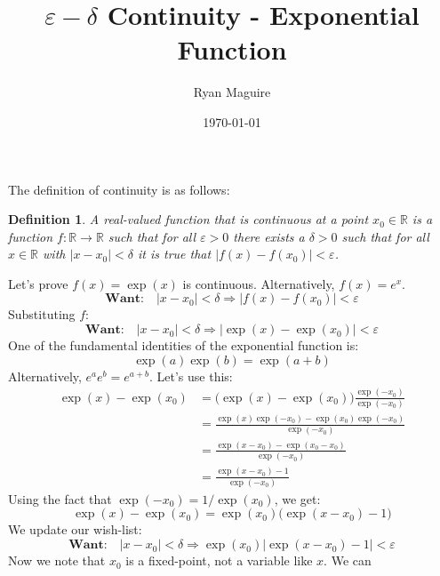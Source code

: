 \documentclass{article}
\title{$\varepsilon-\delta$ Continuity - Exponential Function}
\author{Ryan Maguire}
\date{\today}
\theoremstyle{normal}
\newtheorem{definition}{Definition}
\theoremstyle{plain}
\begin{document}
    \maketitle
    The definition of continuity is as follows:
    \begin{definition}
        A real-valued function that is continuous at a point
        $x_{0}\in\mathbb{R}$ is a function $f:\mathbb{R}\rightarrow\mathbb{R}$
        such that for all $\varepsilon>0$ there exists a $\delta>0$ such that
        for all $x\in\mathbb{R}$ with $|x-x_{0}|<\delta$ it is true that
        $|f(x)-f(x_{0})|<\varepsilon$.
    \end{definition}
    Let's prove $f(x)=\exp(x)$ is continuous. Alternatively, $f(x)=e^{x}$.
    \begin{equation}
        \textbf{Want:}\quad
        |x-x_{0}|<\delta
        \Rightarrow|f(x)-f(x_{0})|<\varepsilon
    \end{equation}
    Substituting $f$:
    \begin{equation}
        \textbf{Want:}\quad
        |x-x_{0}|<\delta
        \Rightarrow
        |\exp(x)-\exp(x_{0})|<\varepsilon
    \end{equation}
    One of the fundamental identities of the exponential function is:
    \begin{equation}
        \exp(a)\exp(b)=\exp(a+b)
    \end{equation}
    Alternatively, $e^{a}e^{b}=e^{a+b}$. Let's use this:
    \begin{align}
        \exp(x)-\exp(x_{0})
            &=\big(\exp(x)-\exp(x_{0})\big)\frac{\exp(-x_{0})}{\exp(-x_{0})}\\
            &=\frac{\exp(x)\exp(-x_{0})-\exp(x_{0})\exp(-x_{0})}{\exp(-x_{0})}\\
            &=\frac{\exp(x-x_{0})-\exp(x_{0}-x_{0})}{\exp(-x_{0})}\\
            &=\frac{\exp(x-x_{0})-1}{\exp(-x_{0})}
    \end{align}
    Using the fact that $\exp(-x_{0})=1/\exp(x_{0})$, we get:
    \begin{equation}
        \exp(x)-\exp(x_{0})
        =\exp(x_{0})\big(\exp(x-x_{0})-1\big)
    \end{equation}
    We update our wish-list:
    \begin{equation}
        \textbf{Want:}\quad
        |x-x_{0}|<\delta
        \Rightarrow
        \exp(x_{0})\big|\exp(x-x_{0})-1\big|<\varepsilon
    \end{equation}
    Now we note that $x_{0}$ is a fixed-point, not a variable like $x$. We can
\end{document}

